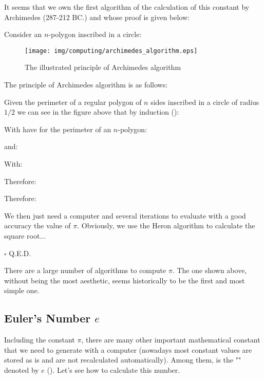 	It seems that we own the first algorithm of the calculation of this constant by Archimedes (287-212 BC.) and whose proof is given below:
	\begin{dem}
		Consider an $n$-polygon inscribed in a circle:
		\begin{figure}[H]
			\begin{center}
			\texttt{[image: img/computing/archimedes\_algorithm.eps]}
			\end{center}	
			\caption{The illustrated principle of Archimedes algorithm}
		\end{figure}
	The principle of Archimedes algorithm is as follows:
	
	Given the perimeter of a regular polygon of $n$ sides inscribed in a circle of radius $1/2$ we can see in the figure above that by induction ():
	
	With have for the perimeter of an $n$-polygon:
	
	and:
	
	With:
	
	Therefore:
	
	Therefore:
	
	We then just need a computer and several iterations to evaluate with a good accuracy the value of $\pi$. Obviously, we use the Heron algorithm to calculate the square root...
	\begin{flushright}
		$\square$  Q.E.D.
	\end{flushright}
	\end{dem}
	
	\begin{tcolorbox}[title=Remark,colframe=black,arc=10pt]
	There are a large number of algorithms to compute $\pi$. The one shown above, without being the most aesthetic, seems historically to be the first and most simple one.
	\end{tcolorbox}
	
	\pagebreak
	\subsection{Euler's Number $e$}
	
	Including the constant $\pi$, there are many other important mathematical constant that we need to generate with a computer (nowadays most constant values are stored as is and are not recalculated automatically). Among them, is the "" denoted by $e$ (). Let's see how to calculate this number.
	
